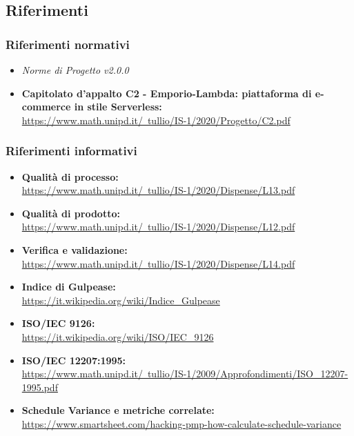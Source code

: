 \subsection{Riferimenti}
\subsubsection{Riferimenti normativi}
\begin{itemize}
    \item \textit{Norme di Progetto v2.0.0}
    \item \textbf{Capitolato d'appalto C2 - Emporio-Lambda: piattaforma di e-commerce in stile Serverless:} \\ \href{https://www.math.unipd.it/~tullio/IS-1/2020/Progetto/C2.pdf}{https://www.math.unipd.it/~tullio/IS-1/2020/Progetto/C2.pdf}
\end{itemize}
\subsubsection{Riferimenti informativi}
\begin{itemize}
    \item \textbf{Qualità di processo:} \\ \href{https://www.math.unipd.it/~tullio/IS-1/2020/Dispense/L13.pdf}{https://www.math.unipd.it/~tullio/IS-1/2020/Dispense/L13.pdf}
    \item \textbf{Qualità di prodotto:} \\ \href{https://www.math.unipd.it/~tullio/IS-1/2020/Dispense/L12.pdf}{https://www.math.unipd.it/~tullio/IS-1/2020/Dispense/L12.pdf}
    \item \textbf{Verifica e validazione:} \\ \href{https://www.math.unipd.it/~tullio/IS-1/2020/Dispense/L14.pdf}{https://www.math.unipd.it/~tullio/IS-1/2020/Dispense/L14.pdf}
    \item \textbf{Indice di Gulpease:} \\ \href{https://it.wikipedia.org/wiki/Indice\_Gulpease}{https://it.wikipedia.org/wiki/Indice\_Gulpease}
    \item \textbf{ISO/IEC 9126:} \\ \href{https://it.wikipedia.org/wiki/ISO/IEC\_9126}{https://it.wikipedia.org/wiki/ISO/IEC\_9126}
    \item \textbf{ISO/IEC 12207:1995:} \\ \href{https://www.math.unipd.it/~tullio/IS-1/2009/Approfondimenti/ISO\_12207-1995.pdf}{https://www.math.unipd.it/~tullio/IS-1/2009/Approfondimenti/ISO\_12207-1995.pdf}
    \item \textbf{Schedule Variance e metriche correlate:} \\ \href{https://www.smartsheet.com/hacking-pmp-how-calculate-schedule-variance}{https://www.smartsheet.com/hacking-pmp-how-calculate-schedule-variance}
\end{itemize}
\newpage